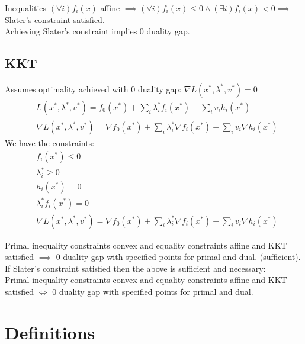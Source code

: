 \message{ !name(notebook.tex)}\documentclass[8pt]{report}
\begin{document}
\begin{multicols*}{2}
  Inequalities $(\forall i)f_i(x)$ affine $\implies (\forall i)f_i(x) \leq 0 \wedge (\exists i) f_i(x) < 0 \implies$ Slater's constraint satisfied.\\
  
  Achieving Slater's constraint implies 0 duality gap.
  \subsection{KKT}
  Assumes optimality achieved with 0 duality gap: $\nabla L(x^*,\lambda^*,v^*)=0$
  \begin{align*}
    &L(x^*,\lambda^*,v^*) = f_0(x^*) + \sum_i \lambda_i^* f_i(x^*) + \sum_i v_i h_i(x^*)\\
    &\nabla L(x^*,\lambda^*,v^*) = \nabla f_0(x^*) + \sum_i \lambda_i^* \nabla f_i(x^*) + \sum_i v_i \nabla h_i(x^*)
  \end{align*}
  We have the constraints:
  \begin{align*}
    &f_i(x^*) \leq 0\\
    &\lambda_i^* \geq 0\\
    &h_i(x^*)=0\\
    &\lambda_i^* f_i(x^*)=0\\
    &\nabla L(x^*,\lambda^*,v^*) = \nabla f_0(x^*) + \sum_i \lambda_i^* \nabla f_i(x^*) + \sum_i v_i \nabla h_i(x^*)
  \end{align*}

  Primal inequality constraints convex and equality constraints affine and KKT satisfied $\implies$ 0 duality gap with specified points for primal and dual. (sufficient).\\

  If Slater's constraint satisfied then the above is sufficient and necessary:\\
  Primal inequality constraints convex and equality constraints affine and KKT satisfied $\iff$ 0 duality gap with specified points for primal and dual.\\
  
  \vfill\null
  
  \pagebreak
  
  \section{Definitions}


\end{multicols*}
\end{document}
